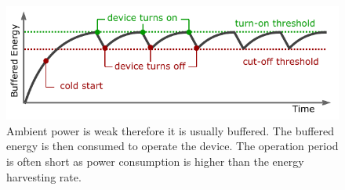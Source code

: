 \begin{figure}[b]
	\centering
		\includegraphics[width=\columnwidth]{figures/intermittent_operation}
		\caption{Ambient power is weak therefore it is usually buffered. The buffered energy is then consumed to operate the device. The operation period is often short as power consumption is higher than the energy harvesting rate.
		}
		\label{fig:intermittent_opertaion}
\end{figure} 
%
